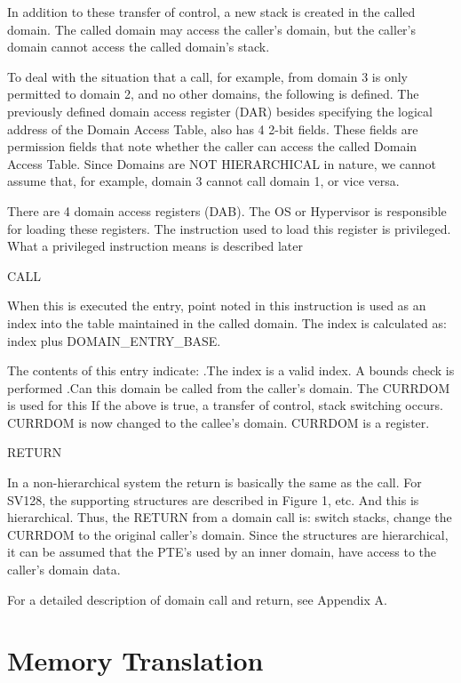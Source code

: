 \documentclass{article}
\begin{document}
In addition to these transfer of control, a new stack is created  in the called domain.  The called domain may access the caller’s domain,  but the caller’s domain cannot access the called domain’s stack.

To deal with the situation that a call, for example, from domain 3 is only permitted to domain 2, and no other domains,  the following is defined. The previously defined domain access register (DAR) besides specifying the logical address of the Domain Access Table,  also has 4 2-bit fields.  These fields are permission fields that note whether the caller can access the called  Domain Access Table.  Since Domains are NOT HIERARCHICAL in nature,  we cannot assume that, for example, domain 3 cannot call domain 1, or vice versa. 

There are 4 domain access registers (DAB).  The OS or Hypervisor is responsible for loading these registers.  The instruction used to load this register is privileged.  What a privileged instruction means is described later

CALL

When this is executed the entry, point noted in this instruction is used as an index into the table maintained in the called domain.  The index is calculated as:  index plus DOMAIN\_ENTRY\_BASE.  

The contents of this entry indicate: 
	.The index is a valid index. A bounds check is performed 
	.Can this domain be called from the caller’s domain. The CURRDOM is used for this
If the above is true,  a transfer of control, stack switching occurs.  CURRDOM is now changed to the callee’s domain. CURRDOM is a register.

RETURN

In a non-hierarchical system the return is basically the same as the call. For SV128, the supporting structures are described in Figure 1, etc.  And this is hierarchical.  Thus, the RETURN from a domain call is:  switch stacks,  change the CURRDOM to the original caller’s domain.  Since the structures are hierarchical,  it can be  assumed that the PTE’s used by an inner domain,  have access to the caller’s domain data. 

For a detailed description of domain call and return, see Appendix A.

\section{Memory Translation}
\end{document}
